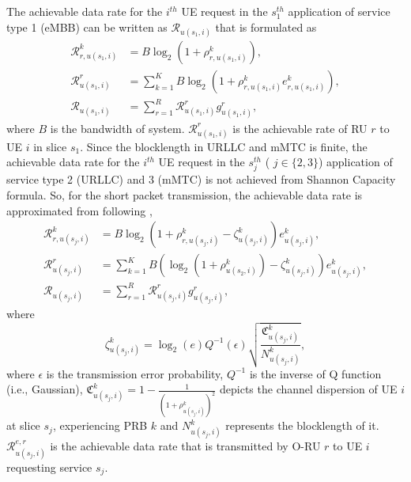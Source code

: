 \documentclass[lettersize,journal]{IEEEtran}
\begin{document}
The achievable data rate for the $i^{th}$ UE request in the $s_{1}^{th}$ application of service type 1 (eMBB) can be written as $\mathcal{R}_{u(s_1,i)}$ that is formulated as
\begin{equation}\label{eq3}
\begin{split}
\mathcal{{R}}_{r,u(s_1,i)}^{k} &=  B \log_2({1+ \rho_{r,u(s_1,i)}^{k}}) ,\\
\mathcal{R}_{u(s_1,i)}^{r} &= \sum_{k=1}^{K} B \log_2({1+ \rho_{r,u(s_1,i)}^{k}} e^k_{r,u(s_1,i)}),\\
\mathcal{R}_{u(s_1,i)} &= \sum_{r=1}^{R}\mathcal{R}_{u(s_1,i)}^{r} g^r_{u(s_1,i)},
\end{split}
\end{equation}
where $B$ is the bandwidth of system.
$\mathcal{R}_{u(s_1,i)}^{r}$ is the achievable rate of RU $r$ to UE $i$ in slice $s_1$.
Since the blocklength in URLLC and mMTC is finite, the achievable data rate for the $i^{th}$ UE request in the $s_{j}^{th}$ ( $j \in \{2,3\}$) application of service type 2 (URLLC) and 3 (mMTC) is not achieved from Shannon Capacity formula. So, for the short packet transmission, the achievable data rate is approximated from following \cite{setayesh2020joint},
\begin{subequations}\label{eq11}
\begin{alignat}{4}
\mathcal{{R}}_{r,u(s_j,i)}^{k} &= B \log_2({1+ \rho_{r,u(s_j,i)}^{k}} - \zeta_{u(s_j,i)}^{k}){e}_{u(s_j,i)}^{k},\\
\mathcal{R}_{u(s_j,i)}^{r} &= \sum_{k=1}^{K} B (\log_2({1+ \rho_{u(s_2,i)}^{k}})- \zeta_{u(s_j,i)}^{k}){e}_{u(s_j,i)}^{k},\\
\mathcal{R}_{u(s_j,i)} &= \sum_{r=1}^{R}\mathcal{R}_{u(s_j,i)}^{r} g^r_{u(s_j,i)},
\end{alignat}
\end{subequations}
where %
\begin{equation}\label{shortPacket}
 \zeta_{u(s_j,i)}^{k} = \log_2({e})Q^{-1}(\epsilon) \sqrt{\frac{\mathfrak{C}_{u(s_j,i)}^{k}}{N_{u(s_j,i)}^{k}}},
\end{equation}
where $\epsilon$ is the transmission error probability, $Q^{-1}$ is the inverse of Q function (i.e., Gaussian),
$\mathfrak{C}_{u(s_j,i)}^{k} = 1 - \frac{1}{(1+\rho_{u(s_j,i)}^{k})^2}$ depicts the channel dispersion of UE  $i$ at slice $s_j$, experiencing PRB $k$ and
$N_{u(s_j,i)}^{k}$ represents the blocklength of it.
$\mathcal{R}_{u(s_j,i)}^{e,r}$ is the achievable data rate that is transmitted by O-RU $r$ to UE $i$ requesting service $s_j$.
\end{document}
